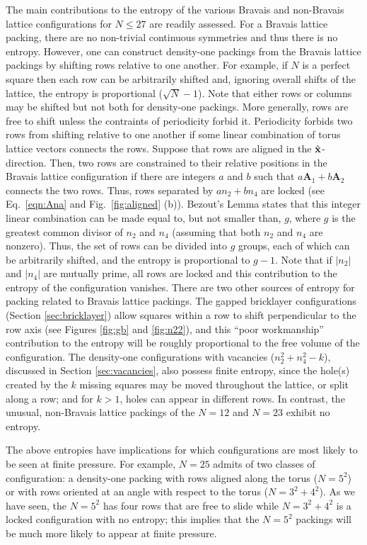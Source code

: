 \documentclass{umthesis}          %
\begin{document}
The main contributions to the entropy of the various Bravais and non-Bravais lattice configurations for $N \leq 27$ are readily assessed. 
 For a Bravais lattice packing, there are no non-trivial continuous symmetries and thus there is no entropy.  However, one can construct density-one packings from the Bravais lattice packings by shifting rows relative to one another.  For example, if $N$ is a perfect square then each row can be arbitrarily shifted and, ignoring overall shifts of the lattice, the entropy is proportional  ($\sqrt{N}-1$).  Note that either rows or columns may be shifted but not both for density-one packings.  More generally, rows are free to shift unless the contraints of periodicity forbid it.  Periodicity forbids two rows from shifting relative to one another if some linear combination of torus lattice vectors connects the rows.  Suppose that rows are aligned in the $\hat{\bf x}$-direction.  Then, two rows are constrained to their relative positions in the Bravais lattice configuration if there are integers $a$ and $b$ such that $a \mathbf{A}_1 + b \mathbf{A}_2$ connects the two rows. Thus, rows separated by $a n_2 + b n_4$ are locked (see Eq.\ \ref{eqn:Ana} and Fig.\  \ref{fig:aligned} (b)).
Bezout's Lemma \cite{Jones1998} states that this integer linear combination can be made equal to, but not smaller than, $g$, where $g$ is the greatest common divisor of $n_2$ and $n_4$ (assuming that both $n_2$ and $n_4$ are nonzero). Thus, the set of rows can be divided into $g$ groups, each of which can be arbitrarily shifted, and the entropy is proportional to $g-1$.
Note that if $|n_2|$ and $|n_4|$ are mutually prime, all rows are locked and this contribution to the entropy of the configuration vanishes. There are two other sources of entropy for packing related to Bravais lattice packings. The gapped bricklayer configurations (Section \ref{sec:bricklayer}) allow squares within a row to shift perpendicular to the row axis (see Figures \ref{fig:gb} and \ref{fig:n22}), and this ``poor workmanship'' contribution to the entropy will be roughly proportional to the free volume of the configuration.  The density-one configurations with vacancies ($n_2^2+n_4^2-k$), discussed in Section \ref{sec:vacancies}, also possess finite entropy, since the hole(s) created by the $k$ missing squares may be moved throughout the lattice, or split along a row; and for $k>1$, holes can appear in different rows.
In contrast, the unusual, non-Bravais lattice packings of the  $N=12$ and $N=23$ exhibit no entropy.


The above entropies have implications for which configurations are most likely to be seen at finite pressure. For example, $N=25$ admits of two classes of configuration:  a density-one packing with rows aligned along the torus ($N=5^2$) or with rows oriented at an angle with respect to the torus ($N=3^2+4^2$).  As we have seen, the $N=5^2$ has four rows that are free to slide while $N=3^2 + 4^2$ is a locked configuration with no entropy; this implies that the $N=5^2$ packings will be much more likely to appear at finite pressure.
\end{document}
